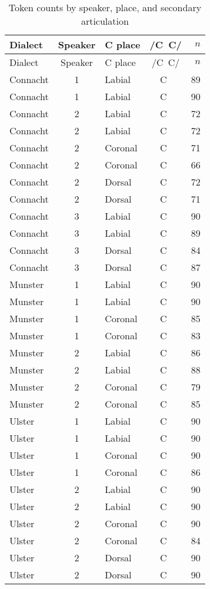 \documentclass[output=paper,colorlinks,citecolor=brown]{langscibook}
\newcommand{\pal}{\ipa{ʲ}}
\newcommand{\vel}{\ipa{ˠ}}
\begin{document}
\begin{longtable}{lclcr}
\caption{Token counts by speaker, place, and secondary articulation}\label{tab:token-counts}\\
\lsptoprule
Dialect & Speaker & C place & /C\vel\ C\pal/ & $n$ \\\midrule
\endfirsthead
\midrule
Dialect & Speaker & C place & /C\vel\ C\pal/ & $n$ \\\midrule
\endhead
\endfoot
\lspbottomrule
\endlastfoot
Connacht& 1 & Labial & C\vel\ &  89 \\ 
  Connacht& 1 & Labial & C\pal\ &  90 \\ 
  \midrule
  Connacht& 2 & Labial & C\vel\ &  72 \\ 
  Connacht& 2 & Labial & C\pal\ &  72 \\ 
  Connacht& 2 & Coronal & C\vel\ &  71 \\ 
  Connacht& 2 & Coronal & C\pal\ &  66 \\ 
  Connacht& 2 & Dorsal & C\vel\ &  72 \\ 
  Connacht& 2 & Dorsal & C\pal\ &  71 \\ 
  \midrule
  Connacht& 3 & Labial & C\vel\ &  90 \\ 
  Connacht& 3 & Labial & C\pal\ &  89 \\ 
  Connacht& 3 & Dorsal & C\vel\ &  84 \\ 
  Connacht& 3 & Dorsal & C\pal\ &  87 \\ 
  \midrule
  Munster& 1 & Labial & C\vel\ &  90 \\ 
  Munster& 1 & Labial & C\pal\ &  90 \\ 
  Munster& 1 & Coronal & C\vel\ &  85 \\ 
  Munster& 1 & Coronal & C\pal\ &  83 \\ 
  \midrule
  Munster& 2 & Labial & C\vel\ &  86 \\ 
  Munster& 2 & Labial & C\pal\ &  88 \\ 
  Munster& 2 & Coronal & C\vel\ &  79 \\ 
  Munster& 2 & Coronal & C\pal\ &  85 \\ 
  \midrule
  Ulster& 1 & Labial & C\vel\ &  90 \\ 
  Ulster& 1 & Labial & C\pal\ &  90 \\ 
  Ulster& 1 & Coronal & C\vel\ &  90 \\ 
  Ulster& 1 & Coronal & C\pal\ &  86 \\ 
  \midrule
  Ulster& 2 & Labial & C\vel\ &  90 \\ 
  Ulster& 2 & Labial & C\pal\ &  90 \\ 
  Ulster& 2 & Coronal & C\vel\ &  90 \\ 
  Ulster& 2 & Coronal & C\pal\ &  84 \\ 
  Ulster& 2 & Dorsal & C\vel\ &  90 \\ 
  Ulster& 2 & Dorsal & C\pal\ &  90 \\ 
\end{longtable}


\printbibliography[heading=subbibliography,notkeyword=this]
\end{document}
